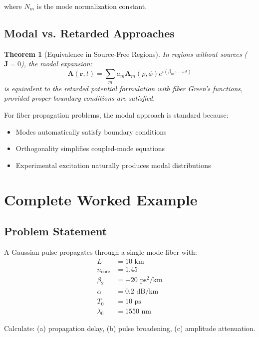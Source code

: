 \documentclass[12pt,a4paper]{article}
\newtheorem{theorem}{Theorem}
\begin{document}
where $N_m$ is the mode normalization constant.

\subsection{Modal vs. Retarded Approaches}

\begin{theorem}[Equivalence in Source-Free Regions]
In regions without sources ($\mathbf{J} = 0$), the modal expansion:
\begin{equation}
\mathbf{A}(\mathbf{r}, t) = \sum_m a_m \mathbf{A}_m(\rho, \phi) e^{i(\beta_m z - \omega t)}
\end{equation}
is equivalent to the retarded potential formulation with fiber Green's functions, provided proper boundary conditions are satisfied.
\end{theorem}

For fiber propagation problems, the modal approach is standard because:
\begin{itemize}[leftmargin=*]
\item Modes automatically satisfy boundary conditions
\item Orthogonality simplifies coupled-mode equations
\item Experimental excitation naturally produces modal distributions
\end{itemize}

\section{Complete Worked Example}

\subsection{Problem Statement}

A Gaussian pulse propagates through a single-mode fiber with:
\begin{align*}
L &= 10 \text{ km} \\
n_{\text{core}} &= 1.45 \\
\beta_2 &= -20 \text{ ps}^2/\text{km} \\
\alpha &= 0.2 \text{ dB/km} \\
T_0 &= 10 \text{ ps} \\
\lambda_0 &= 1550 \text{ nm}
\end{align*}

Calculate: (a) propagation delay, (b) pulse broadening, (c) amplitude attenuation.
\end{document}
